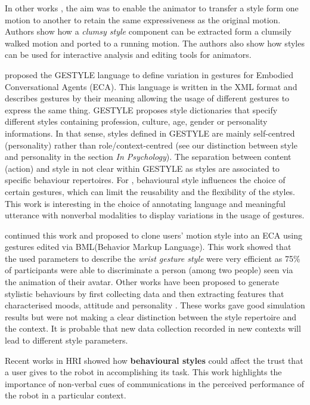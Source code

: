 \documentclass[a4paper,twocolumn]{svjour3}
\begin{document}
In other works \cite{shapiro2006style}, the aim was to enable the animator to transfer a style form one motion to another to retain the same expressiveness as the original motion.
Authors show how a\textit{ clumsy style} component can be extracted form a clumsily walked motion and ported to a running motion. 
The authors also show how styles can be used for interactive analysis and editing tools for animators.

\cite{Noot2004} proposed the GESTYLE language to define variation in gestures for Embodied Conversational Agents (ECA). 
This language is written in the XML format and describes gestures by their meaning allowing the usage of different gestures to express the same thing.
GESTYLE proposes style dictionaries that specify different styles containing profession, culture, age, gender or personality informations.
In that sense, styles defined in GESTYLE are mainly self-centred (personality) rather than role/context-centred (see our distinction between style and personality in the section \textit{In Psychology}). 
The separation between content (action) and style in not clear within GESTYLE as styles are associated to specific behaviour repertoires.
For \cite{Noot2004}, behavioural style influences the choice of certain gestures, which can limit the reusability and the flexibility of the styles.
This work is interesting in the choice of annotating language and meaningful utterance with nonverbal modalities to display variations in the usage of gestures.

\cite{Rajagopal2012} continued this work and proposed to clone users' motion style into an ECA using gestures edited via BML(Behavior Markup Language).
This work showed that the used parameters to describe the \textit{wrist gesture style} were very efficient as 75\% of participants were able to discriminate a person (among two people) seen via the animation of their avatar.
Other works have been proposed to generate stylistic behaviours by first collecting data and then extracting features that characterised moods, attitude and personality \cite{Kang2013a,Czy2009}. 
These works gave good simulation results but were not making a clear distinction between the style repertoire and the context. 
It is probable that new data collection recorded in new contexts will lead to different style parameters.

Recent works in HRI showed how \textbf{behavioural styles} \cite{Ligthart2013,VandenBrule2014} could affect the trust that a user gives to the robot in accomplishing its task. 
This work highlights the importance of non-verbal cues of communications in the perceived performance of the robot in a particular context. 
\end{document}
